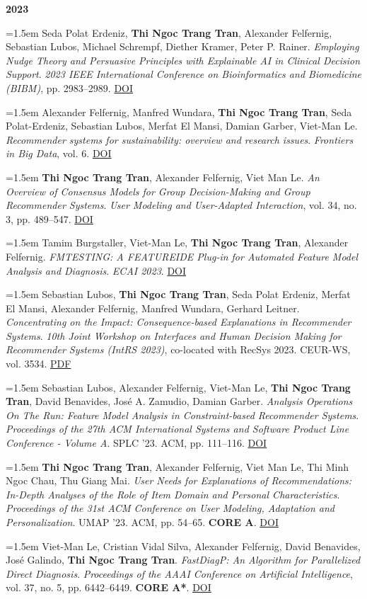 \documentclass[11pt,a4paper]{article}
\newcommand{\pub}[1]{%
  \par\noindent\hangindent=1.5em\hangafter=1 #1\par\vspace{0.5ex}}
\newcommand{\pubyear}[1]{\vspace{0.7ex}\par\noindent\textbf{#1}\par\vspace{0.2ex}}
\begin{document}
\pubyear{2023}
\pub{Seda Polat Erdeniz, \textbf{Thi Ngoc Trang Tran}, Alexander Felfernig, Sebastian Lubos, Michael Schrempf, Diether Kramer, Peter P. Rainer. \textit{Employing Nudge Theory and Persuasive Principles with Explainable AI in Clinical Decision Support}. \textit{2023 IEEE International Conference on Bioinformatics and Biomedicine (BIBM)}, pp. 2983–2989. \href{https://doi.org/10.1109/bibm58861.2023.10385315}{DOI}}
\pub{Alexander Felfernig, Manfred Wundara, \textbf{Thi Ngoc Trang Tran}, Seda Polat-Erdeniz, Sebastian Lubos, Merfat El Mansi, Damian Garber, Viet-Man Le. \textit{Recommender systems for sustainability: overview and research issues}. \textit{Frontiers in Big Data}, vol. 6. \href{https://doi.org/10.3389/fdata.2023.1284511}{DOI}}
\pub{\textbf{Thi Ngoc Trang Tran}, Alexander Felfernig, Viet Man Le. \textit{An Overview of Consensus Models for Group Decision-Making and Group Recommender Systems}. \textit{User Modeling and User-Adapted Interaction}, vol. 34, no. 3, pp. 489–547. \href{https://doi.org/10.1007/s11257-023-09380-z}{DOI}}
\pub{Tamim Burgstaller, Viet-Man Le, \textbf{Thi Ngoc Trang Tran}, Alexander Felfernig. \textit{FMTESTING: A FEATUREIDE Plug-in for Automated Feature Model Analysis and Diagnosis}. \textit{ECAI 2023}. \href{https://doi.org/10.3233/faia230640}{DOI}}
\pub{Sebastian Lubos, \textbf{Thi Ngoc Trang Tran}, Seda Polat Erdeniz, Merfat El Mansi, Alexander Felfernig, Manfred Wundara, Gerhard Leitner. \textit{Concentrating on the Impact: Consequence-based Explanations in Recommender Systems}. \textit{10th Joint Workshop on Interfaces and Human Decision Making for Recommender Systems (IntRS 2023)}, co-located with RecSys 2023. CEUR-WS, vol. 3534. \href{https://ceur-ws.org/Vol-3534/paper5.pdf}{PDF}}
\pub{Sebastian Lubos, Alexander Felfernig, Viet-Man Le, \textbf{Thi Ngoc Trang Tran}, David Benavides, José A. Zamudio, Damian Garber. \textit{Analysis Operations On The Run: Feature Model Analysis in Constraint-based Recommender Systems}. \textit{Proceedings of the 27th ACM International Systems and Software Product Line Conference - Volume A}. SPLC ’23. ACM, pp. 111–116. \href{https://doi.org/10.1145/3579027.3608982}{DOI}}
\pub{\textbf{Thi Ngoc Trang Tran}, Alexander Felfernig, Viet Man Le, Thi Minh Ngoc Chau, Thu Giang Mai. \textit{User Needs for Explanations of Recommendations: In-Depth Analyses of the Role of Item Domain and Personal Characteristics}. \textit{Proceedings of the 31st ACM Conference on User Modeling, Adaptation and Personalization}. UMAP ’23. ACM, pp. 54–65. \textbf{CORE A}. \href{https://doi.org/10.1145/3565472.3592950}{DOI}}
\pub{Viet-Man Le, Cristian Vidal Silva, Alexander Felfernig, David Benavides, José Galindo, \textbf{Thi Ngoc Trang Tran}. \textit{FastDiagP: An Algorithm for Parallelized Direct Diagnosis}. \textit{Proceedings of the AAAI Conference on Artificial Intelligence}, vol. 37, no. 5, pp. 6442–6449. \textbf{CORE A*}. \href{https://doi.org/10.1609/aaai.v37i5.25792}{DOI}}
\end{document}
